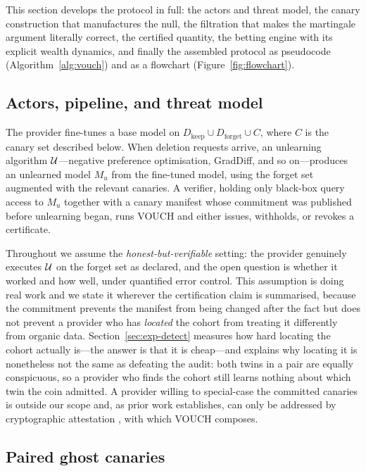 This section develops the protocol in full: the actors and threat model, the canary
construction that manufactures the null, the filtration that makes the martingale
argument literally correct, the certified quantity, the betting engine with its
explicit wealth dynamics, and finally the assembled protocol as pseudocode
(Algorithm~\ref{alg:vouch}) and as a flowchart (Figure~\ref{fig:flowchart}).

\subsection{Actors, pipeline, and threat model}\label{sec:setting}

The provider fine-tunes a base model on
$D_{\text{keep}} \cup D_{\text{forget}} \cup C$, where $C$ is the canary set described
below. When deletion requests arrive, an unlearning algorithm $\mathcal{U}$---negative
preference optimisation, GradDiff, and so on---produces an unlearned model $M_u$ from
the fine-tuned model, using the forget set augmented with the relevant canaries. A
verifier, holding only black-box query access to $M_u$ together with a canary manifest
whose commitment was published before unlearning began, runs VOUCH and either issues,
withholds, or revokes a certificate.

Throughout we assume the \emph{honest-but-verifiable} setting: the provider genuinely
executes $\mathcal{U}$ on the forget set as declared, and the open question is whether it
worked and how well, under quantified error control. This assumption is doing real
work and we state it wherever the certification claim is summarised, because the
commitment prevents the manifest from being changed after the fact but does not
prevent a provider who has \emph{located} the cohort from treating it differently
from organic data. Section~\ref{sec:exp-detect} measures how hard locating the cohort
actually is---the answer is that it is cheap---and explains why
locating it is nonetheless not the same as defeating the audit: both twins in a pair
are equally conspicuous, so a provider who finds the cohort still learns nothing
about which twin the coin admitted. A provider willing to special-case the committed
canaries is outside our scope and, as prior work establishes, can only be addressed
by cryptographic attestation \citep{eisenhofer2025verifiable}, with which VOUCH
composes.

\subsection{Paired ghost canaries}\label{sec:canaries}

